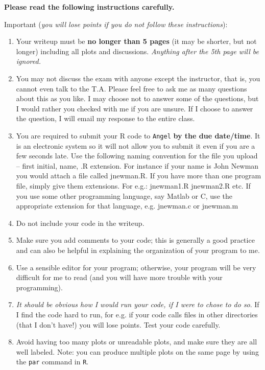 \message{ !name(takehome15.tex)}\documentclass[11pt]{article}
\begin{document}
{\bf Please read the following instructions carefully.}

Important ({\it you will lose points if you do not follow these instructions}): 
\begin{enumerate}
\item Your writeup must be {\bf no longer than 5 pages} (it may be
  shorter, but not longer) including all plots and discussions. {\it
    Anything after the 5th page will be ignored.}
\item You may not discuss the exam with anyone except the instructor,
  that is, you cannot even talk to the T.A. Please feel free to ask me
  as many questions about this as you like. I may choose not to answer
  some of the questions, but I would rather you checked with me if you
  are unsure. If I choose to answer the question, I will email my
  response to the entire class.
\item You are required to submit your R code to {\tt Angel} {\bf by
    the due date/time}. It is an electronic system so it will not
  allow you to submit it even if you are a few seconds late.  Use the
  following naming convention for the file you upload -- first
  initial, name, .R extension. For instance if your name is John
  Newman you would attach a file called jnewman.R. If you have more
  than one program file, simply give them extensions.  For e.g.:
  jnewman1.R jnewman2.R etc.  If you use some other programming
  language, say Matlab or C, use the appropriate extension for that
  language, e.g. jnewman.c or jnewman.m
\item Do not include your code in the writeup.
\item Make sure you add comments to your code; this is generally a
  good practice and can also be helpful in explaining the organization
  of your program to me.
\item Use a sensible editor for your program; otherwise, your program
  will be very difficult for me to read (and you will have more
  trouble with your programming).
\item %
  {\it It should be obvious how I would run your code, if I were to
    chose to do so}. If I find the code hard to run, for e.g. if your code
  calls files in other directories (that I don't have!) you will
  lose points. Test your code carefully.
\item Avoid having too many plots or unreadable plots, and make sure
  they are all well labeled. Note: you can produce multiple plots on
  the same page by using the {\tt par} command in {\tt R}.
\end{enumerate}
\end{document}
